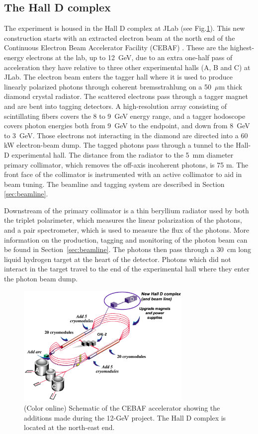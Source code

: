 \subsection[The Hall D complex]{The Hall D complex \label{sec:gluexexperiment:complex}}
The \gx{} experiment is housed in the Hall D complex at JLab (see Fig.\ref{fig:CEBAF-graphic}). This new construction starts with an extracted electron beam at the north end of the Continuous Electron Beam Accelerator Facility (CEBAF) \cite{Leemann:2001dg}. These are the highest-energy electrons at the lab, up to 12~GeV, due to an extra one-half pass of acceleration they have relative to three other experimental halls (A, B and C) at JLab. The electron beam enters the tagger hall where it is used to produce linearly polarized photons through coherent bremsstrahlung on a 50~$\mu$m thick diamond crystal radiator.
The scattered electrons pass through a tagger magnet and are bent into tagging detectors. A high-resolution array consisting of scintillating fibers covers the 8 to 9~GeV energy range, and a tagger hodoscope covers photon energies both from 9~GeV to the endpoint, and down from 8~GeV to 3~GeV. Those electrons not interacting in the diamond are directed into a 60 kW electron-beam dump. The tagged photons pass through a tunnel to the Hall-D experimental hall. The distance from the radiator to the 5~mm diameter primary collimator, which removes the off-axis incoherent photons, is 75 m. The front face of the collimator is instrumented with an active collimator to aid in beam tuning.  The beamline and tagging system are described in Section\,\ref{sec:beamline}.

Downstream of the primary collimator is a thin beryllium radiator used by both the triplet polarimeter, which measures the linear polarization of the photons, and a pair spectrometer, which is used to measure the flux of the photons. More information on the production, tagging and monitoring of the photon beam can be found in Section~\ref{sec:beamline}. The photons then pass through a 30~cm long liquid hydrogen target at the heart of the \gx{} detector. Photons which did not interact in the target travel to the end of the experimental hall where they enter the photon beam dump.

\begin{figure}[tbp]\centering
\includegraphics[width=0.75\textwidth]{figures/CEBAF-graphic.png}
\caption[]{\label{fig:CEBAF-graphic}(Color online) Schematic of the CEBAF accelerator showing the additions made during the 12-GeV project. The Hall D complex is located at the north-east end.}
\end{figure}


